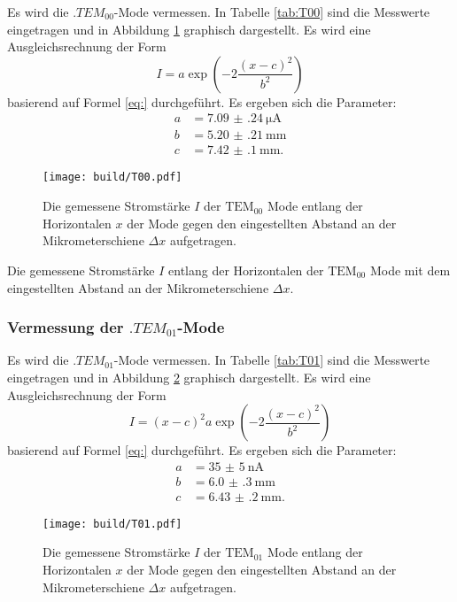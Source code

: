 Es wird die $.{TEM}_{00}$-Mode vermessen.
In Tabelle \ref{tab:T00} sind die Messwerte eingetragen und in Abbildung \ref{fig:T00} graphisch dargestellt.
Es wird eine Ausgleichsrechnung der Form
\[
I = a\exp\left(-2\frac{(x-c)^2}{b^2}\right)
\] 
basierend auf Formel \eqref{eq:} durchgeführt.
Es ergeben sich die Parameter:
\begin{align*}
a &= \SI{7.09(24)}{\micro\ampere}\\
b &= \SI{5.20(21)}{\milli\metre}\\
c &= \SI{7.42(10)}{\milli\metre}\text{.}
\end{align*}

\begin{figure}
	\centering
	\texttt{[image: build/T00.pdf]}
	\caption{Die gemessene Stromstärke $I$ der $\text{TEM}_{00}$ Mode entlang der Horizontalen $x$ der Mode gegen den eingestellten Abstand an der Mikrometerschiene $\Delta x$ aufgetragen.}
	\label{fig:T00}
\end{figure}

\begin{table}
	\centering
	\caption{Die gemessene Stromstärke $I$ entlang der Horizontalen der $\text{TEM}_{\text{00}}$ Mode mit dem eingestellten Abstand an der Mikrometerschiene $\Delta x$.}
	
	\label{tab:T00}
\end{table}


\subsubsection{Vermessung der $.{TEM}_{01}$-Mode}

Es wird die $.{TEM}_{01}$-Mode vermessen.
In Tabelle \ref{tab:T01} sind die Messwerte eingetragen und in Abbildung \ref{fig:T01} graphisch dargestellt.
Es wird eine Ausgleichsrechnung der Form
\[
I = (x-c)^2a\exp\left(-2\frac{(x-c)^2}{b^2}\right)
\] 
basierend auf Formel \eqref{eq:} durchgeführt.
Es ergeben sich die Parameter:
\begin{align*}
a &= \SI{35(5)}{\nano\ampere}\\
b &= \SI{6.0(3)}{\milli\metre}\\
c &= \SI{6.43(20)}{\milli\metre}\text{.}
\end{align*}

\begin{figure}
	\centering
	\texttt{[image: build/T01.pdf]}
	\caption{Die gemessene Stromstärke $I$ der $\text{TEM}_{01}$ Mode entlang der Horizontalen $x$ der Mode gegen den eingestellten Abstand an der Mikrometerschiene $\Delta x$ aufgetragen.}
	\label{fig:T01}
\end{figure}


